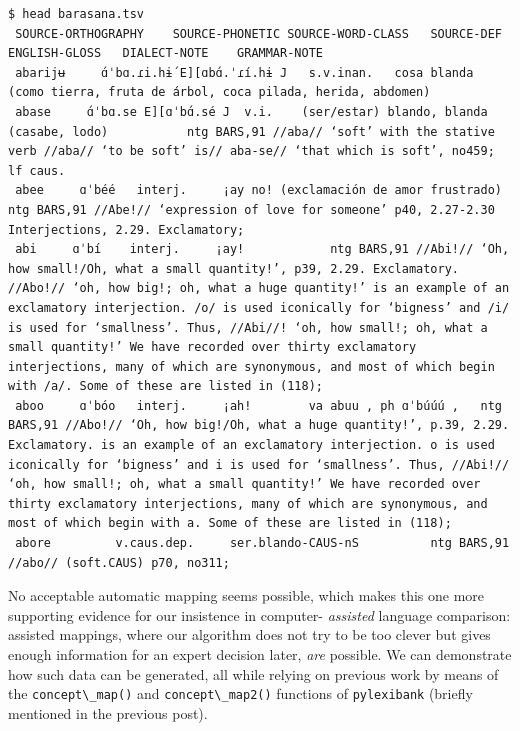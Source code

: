\documentclass[
  a4paper,
  14pt,
  oneside,
  tablecaptionabove
]{scrbook}
\newcommand{\passthrough}[1]{#1}
\begin{document}
\begin{lstlisting}
$ head barasana.tsv
 SOURCE-ORTHOGRAPHY    SOURCE-PHONETIC SOURCE-WORD-CLASS   SOURCE-DEF  ENGLISH-GLOSS   DIALECT-NOTE    GRAMMAR-NOTE
 abarijʉ     ɑ́ˈbɑ.ɾi.hɨ́ E][ɑbɑ́.ˈɾí.hɨ J   s.v.inan.   cosa blanda (como tierra, fruta de árbol, coca pilada, herida, abdomen)
 abase     ɑ́ˈbɑ.se E][ɑˈbɑ́.sé J  v.i.    (ser/estar) blando, blanda (casabe, lodo)           ntg BARS,91 //aba// ‘soft’ with the stative verb //aba// ‘to be soft’ is// aba-se// ‘that which is soft’, no459; lf caus.
 abee     ɑˈbéé   interj.     ¡ay no! (exclamación de amor frustrado)             ntg BARS,91 //Abe!// ‘expression of love for someone’ p40, 2.27-2.30 Interjections, 2.29. Exclamatory;
 abi     ɑˈbí    interj.     ¡ay!            ntg BARS,91 //Abi!// ‘Oh, how small!/Oh, what a small quantity!’, p39, 2.29. Exclamatory. //Abo!// ‘oh, how big!; oh, what a huge quantity!’ is an example of an exclamatory interjection. /o/ is used iconically for ‘bigness’ and /i/ is used for ‘smallness’. Thus, //Abi//! ‘oh, how small!; oh, what a small quantity!’ We have recorded over thirty exclamatory interjections, many of which are synonymous, and most of which begin with /a/. Some of these are listed in (118);
 aboo     ɑˈbóo   interj.     ¡ah!        va abuu , ph ɑˈbúúú ,   ntg BARS,91 //Abo!// ‘Oh, how big!/Oh, what a huge quantity!’, p.39, 2.29. Exclamatory. is an example of an exclamatory interjection. o is used iconically for ‘bigness’ and i is used for ‘smallness’. Thus, //Abi!// ‘oh, how small!; oh, what a small quantity!’ We have recorded over thirty exclamatory interjections, many of which are synonymous, and most of which begin with a. Some of these are listed in (118);
 abore         v.caus.dep.     ser.blando-CAUS-nS          ntg BARS,91 //abo// (soft.CAUS) p70, no311;
\end{lstlisting}

No acceptable automatic mapping seems possible, which makes this one
more supporting evidence for our insistence in computer- \emph{assisted}
language comparison: assisted mappings, where our algorithm does not try
to be too clever but gives enough information for an expert decision
later, \emph{are} possible. We can demonstrate how such data can be
generated, all while relying on previous work by means of the
\passthrough{\lstinline!concept\_map()!} and
\passthrough{\lstinline!concept\_map2()!} functions of
\passthrough{\lstinline!pylexibank!} (briefly mentioned in the previous
post).
\end{document}
